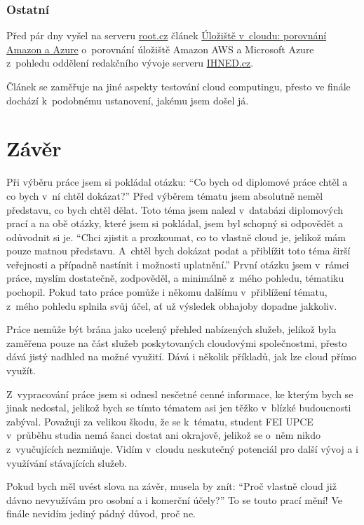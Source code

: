 \subsubsection{Ostatní}
Před pár dny vyšel na serveru \href{http://root.cz}{root.cz} článek \href{http://www.root.cz/clanky/uloziste-v-cloudu-porovnani-amazon-a-azure/}{Úložiště v~cloudu: porovnání Amazon a Azure\cite{root:porovnaniAzureAWS}} o~porovnání úložiště Amazon AWS a Microsoft Azure z~pohledu oddělení redakčního vývoje serveru \href{http: //ihned.cz}{IHNED.cz}. 

Článek se zaměřuje na jiné aspekty testování cloud computingu, přesto ve finále dochází k~podobnému ustanovení, jakému jsem došel já.

\newpage
\section{Závěr}
Při výběru práce jsem si pokládal otázku: "`Co bych od diplomové práce chtěl a co bych v~ní chtěl dokázat?"' Před výběrem tématu jsem absolutně neměl představu, co bych chtěl dělat. Toto téma jsem nalezl v~databázi diplomových prací a na obě otázky, které jsem si pokládal, jsem byl schopný si odpovědět a odůvodnit si je. "`Chci zjistit a prozkoumat, co to vlastně cloud je, jelikož mám pouze matnou představu. A~chtěl bych dokázat podat a přiblížit toto téma širší veřejnosti a případně nastínit i možnosti uplatnění."' První otázku jsem v~rámci práce, myslím dostatečně, zodpověděl, a minimálně z~mého pohledu, tématiku pochopil. Pokud tato práce pomůže i někomu dalšímu v~přiblížení tématu, z~mého pohledu splnila svůj účel, ať už výsledek obhajoby dopadne jakkoliv.

Práce nemůže být brána jako ucelený přehled nabízených služeb, jelikož byla zaměřena pouze na část služeb poskytovaných cloudovými společnostmi, přesto dává jistý nadhled na možné využití. Dává i několik příkladů, jak lze cloud přímo využít.

Z~vypracování práce jsem si odnesl nesčetné cenné informace, ke kterým bych se jinak nedostal, jelikož bych se tímto tématem asi jen těžko v~blízké budoucnosti zabýval. Považuji za velikou škodu, že se k~tématu, student FEI UPCE v~průběhu studia nemá šanci dostat ani okrajově, jelikož se o~něm nikdo z~vyučujících nezmiňuje. Vidím v~cloudu neskutečný potenciál pro další vývoj a i využívání stávajících služeb.

Pokud bych měl uvést slova na závěr, musela by znít: "`Proč vlastně cloud již dávno nevyužívám pro osobní a i komerční účely?"' To se touto prací mění! Ve finále nevidím jediný pádný důvod, proč ne.